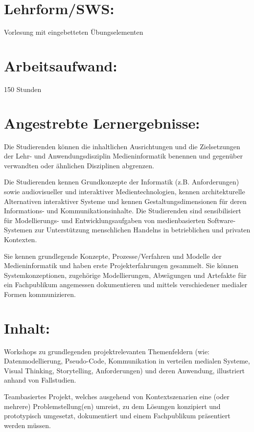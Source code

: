 \section*{Lehrform/SWS:}\label{lehrformsws-9}

Vorlesung mit eingebetteten Übungselementen

\section*{Arbeitsaufwand:}\label{arbeitsaufwand-9}

150 Stunden

\section*{Angestrebte
Lernergebnisse:}\label{angestrebte-lernergebnisse-9}

Die Studierenden können die inhaltlichen Ausrichtungen und die
Zielsetzungen der Lehr- und Anwendungsdisziplin Medieninformatik
benennen und gegenüber verwandten oder ähnlichen Disziplinen abgrenzen.

Die Studierenden kennen Grundkonzepte der Informatik (z.B.
Anforderungen) sowie audiovisueller und interaktiver Medientechnologien,
kennen architekturelle Alternativen interaktiver Systeme und kennen
Gestaltungsdimensionen für deren Informations- und
Kommunikationsinhalte. Die Studierenden sind sensibilisiert für
Modellierungs- und Entwicklungsaufgaben von medienbasierten
Software-Systemen zur Unterstützung menschlichen Handelns in
betrieblichen und privaten Kontexten.

Sie kennen grundlegende Konzepte, Prozesse/Verfahren und Modelle der
Medieninformatik und haben erste Projekterfahrungen gesammelt. Sie
können Systemkonzeptionen, zugehörige Modellierungen, Abwägungen und
Artefakte für ein Fachpublikum angemessen dokumentieren und mittels
verschiedener medialer Formen kommunizieren.

\section*{Inhalt:}\label{inhalt-9}

Workshops zu grundlegenden projektrelevanten Themenfeldern (wie:
Datenmodellierung, Pseudo-Code, Kommunikation in verteilen medialen
Systeme, Visual Thinking, Storytelling, Anforderungen) und deren
Anwendung, illustriert anhand von Fallstudien.

Teambasiertes Projekt, welches ausgehend von Kontextszenarien eine (oder
mehrere) Problemstellung(en) umreist, zu dem Lösungen konzipiert und
prototypisch umgesetzt, dokumentiert und einem Fachpublikum präsentiert
werden müssen.

